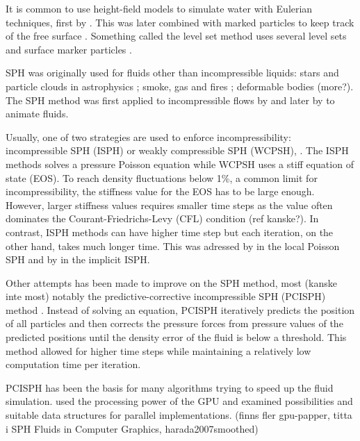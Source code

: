 \documentclass[../../main.tex]{subfiles}
\begin{document}
It is common to use height-field models to simulate water with Eulerian techniques, first by \citet{kass1990rapid}. This was later combined with marked particles to keep track of the free surface \citep{foster1996realistic}. Something called the level set method uses several level sets and surface marker particles \citep{enright2002hybrid}. 

SPH was originally used for fluids other than incompressible liquids: stars and particle clouds in astrophysics \citep{lucy1977numerical, gingold1977smoothed}; smoke, gas and fires \citep{stam1995depicting}; deformable bodies \citep{desbrun1996smoothed} (more?). The SPH method was first applied to incompressible flows by \citet{monaghan1994simulating} and later by \citet{muller2003particle} to animate fluids. 

Usually, one of two strategies are used to enforce incompressibility: incompressible SPH (ISPH) or weakly compressible SPH (WCPSH), \citep{becker2007weakly}. The ISPH methods solves a pressure Poisson equation while WCPSH uses a stiff equation of state (EOS). To reach density fluctuations below 1\%, a common limit for incompressibility, the stiffness value for the EOS has to be large enough. However, larger stiffness values requires smaller time steps as the value often dominates the Courant-Friedrichs-Levy (CFL) condition (ref kanske?). In contrast, ISPH methods can have higher time step but each iteration, on the other hand, takes much longer time. This was adressed by \citet{he2012local} in the local Poisson SPH and by \citet{ihmsen2014implicit} in the implicit ISPH. 

Other attempts has been made to improve on the SPH method, most (kanske inte most) notably the predictive-corrective incompressible SPH (PCISPH) method \citep{solenthaler2009predictive}. Instead of solving an equation, PCISPH iteratively predicts the position of all particles and then corrects the pressure forces from pressure values of the predicted positions until the density error of the fluid is below a threshold. This method allowed for higher time steps while maintaining a relatively low computation time per iteration. 

PCISPH has been the basis for many algorithms trying to speed up the fluid simulation. \citet{goswami2010interactive} used the processing power of the GPU and \citet{ihmsen2011parallel} examined possibilities and suitable data structures for parallel implementations. (finns fler gpu-papper, titta i SPH Fluids in Computer Graphics, harada2007smoothed)
\end{document}

